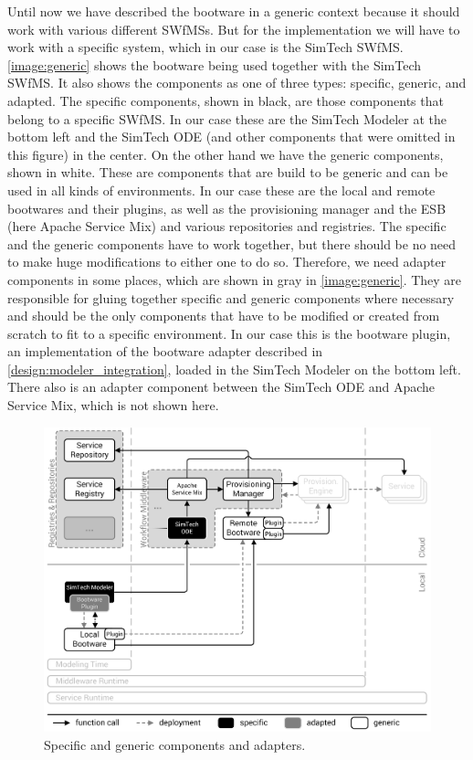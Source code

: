 Until now we have described the bootware in a generic context because it should work with various different SWfMSs.
But for the implementation we will have to work with a specific system, which in our case is the SimTech SWfMS.
\autoref{image:generic} shows the bootware being used together with the SimTech SWfMS.
It also shows the components as one of three types: specific, generic, and adapted.
The specific components, shown in black, are those components that belong to a specific SWfMS.
In our case these are the SimTech Modeler at the bottom left and the SimTech ODE (and other components that were omitted in this figure) in the center.
On the other hand we have the generic components, shown in white.
These are components that are build to be generic and can be used in all kinds of environments.
In our case these are the local and remote bootwares and their plugins, as well as the provisioning manager and the ESB (here Apache Service Mix) and various repositories and registries.
The specific and the generic components have to work together, but there should be no need to make huge modifications to either one to do so.
Therefore, we need adapter components in some places, which are shown in gray in \autoref{image:generic}.
They are responsible for gluing together specific and generic components where necessary and should be the only components that have to be modified or created from scratch to fit to a specific environment.
In our case this is the bootware plugin, an implementation of the bootware adapter described in \autoref{design:modeler_integration}, loaded in the SimTech Modeler on the bottom left.
There also is an adapter component between the SimTech ODE and Apache Service Mix, which is not shown here.

\begin{figure}[!htbp]
	\centering
	\includegraphics[resolution=600]{implementation/assets/generic}
	\caption{Specific and generic components and adapters.}
	\label{image:generic}
\end{figure}

